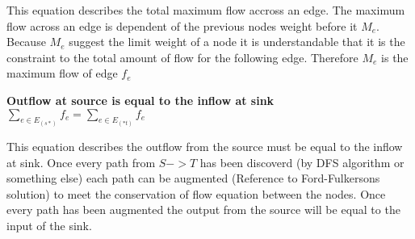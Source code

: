 \documentclass[11pt, oneside]{article}
\begin{document}
\begin{enumerate}
	This equation describes the total maximum flow accross an edge. The maximum flow across an edge is dependent of the previous nodes weight before it $M_e$. Because $M_e$ suggest the limit weight of a node it is understandable that it is the constraint to the total amount of flow for the following edge. Therefore $M_e$ is the maximum flow of edge $f_e$
	
	\begin{center}
		\textbf{Outflow at source is equal to the inflow at sink}
		\linebreak
		\linebreak
		$\displaystyle\sum_{e \in E_{(s*)}}f_e = \displaystyle\sum_{e \in E_{(*t)}}f_e$ 
	\end{center}

	This equation describes the outflow from the source must be equal to the inflow at sink. Once every path from $S -> T$ has been discoverd (by DFS algorithm or something else) each path can be augmented (Reference to Ford-Fulkersons solution) to meet the conservation of flow equation between the nodes. Once every path has been augmented the output from the source will be equal to the input of the sink.


\end{enumerate}
\end{document}
